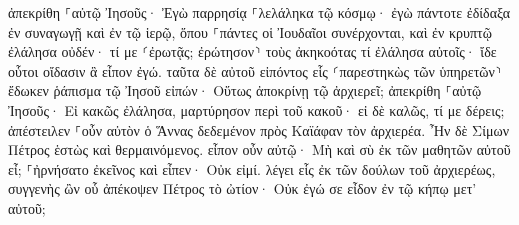 \documentclass{openreader}
\begin{document}
ἀπεκρίθη ⸀αὐτῷ Ἰησοῦς· Ἐγὼ παρρησίᾳ ⸀λελάληκα τῷ κόσμῳ· ἐγὼ πάντοτε ἐδίδαξα ἐν συναγωγῇ καὶ ἐν τῷ ἱερῷ, ὅπου ⸀πάντες οἱ Ἰουδαῖοι συνέρχονται, καὶ ἐν κρυπτῷ ἐλάλησα οὐδέν· 
τί με ⸂ἐρωτᾷς; ἐρώτησον⸃ τοὺς ἀκηκοότας τί ἐλάλησα αὐτοῖς· ἴδε οὗτοι οἴδασιν ἃ εἶπον ἐγώ. 
ταῦτα δὲ αὐτοῦ εἰπόντος εἷς ⸂παρεστηκὼς τῶν ὑπηρετῶν⸃ ἔδωκεν ῥάπισμα τῷ Ἰησοῦ εἰπών· Οὕτως ἀποκρίνῃ τῷ ἀρχιερεῖ; 
ἀπεκρίθη ⸀αὐτῷ Ἰησοῦς· Εἰ κακῶς ἐλάλησα, μαρτύρησον περὶ τοῦ κακοῦ· εἰ δὲ καλῶς, τί με δέρεις; 
ἀπέστειλεν ⸀οὖν αὐτὸν ὁ Ἅννας δεδεμένον πρὸς Καϊάφαν τὸν ἀρχιερέα. 
Ἦν δὲ Σίμων Πέτρος ἑστὼς καὶ θερμαινόμενος. εἶπον οὖν αὐτῷ· Μὴ καὶ σὺ ἐκ τῶν μαθητῶν αὐτοῦ εἶ; ⸀ἠρνήσατο ἐκεῖνος καὶ εἶπεν· Οὐκ εἰμί. 
λέγει εἷς ἐκ τῶν δούλων τοῦ ἀρχιερέως, συγγενὴς ὢν οὗ ἀπέκοψεν Πέτρος τὸ ὠτίον· Οὐκ ἐγώ σε εἶδον ἐν τῷ κήπῳ μετ’ αὐτοῦ; 
\end{document}
